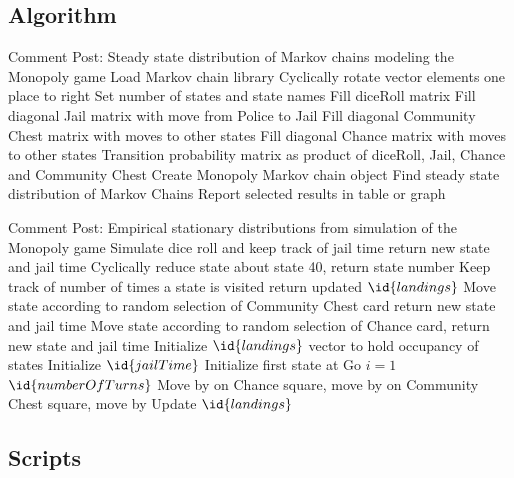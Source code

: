\documentclass[12pt]{article}
\begin{document}
\subsection*{Algorithm}
\begin{codebox}
  \zi Comment Post:  Steady state distribution
  \zi of Markov chains modeling the Monopoly game
  \li Load Markov chain library
  \li {}
  \li Cyclically rotate vector elements one place to right
  \zi
  \li Set number of states and state names
  \zi
  \li Fill diceRoll matrix
  \zi
  \li Fill diagonal Jail matrix with move from Police to Jail
  \zi
  \li Fill diagonal Community Chest matrix with moves to other states
  \zi
  \li Fill diagonal Chance matrix with moves to other states
  \zi
  \li Transition probability matrix as product of
  \zi diceRoll, Jail, Chance and Community Chest
  \li Create Monopoly Markov chain object
  \li Find steady state distribution of Markov Chains
  \li Report selected results in table or graph 
\end{codebox}

\begin{codebox}
  \zi Comment Post: Empirical stationary distributions
  \zi from simulation of the Monopoly game
  \li {}
  \li Simulate dice roll and
  \li keep track of jail time
  \li return new state and jail time
  \zi
  \li {}
  \li Cyclically reduce state about state 40,
  \li return state number
  \zi
  \li {}
  \li Keep track of number of times a state is visited
  \li return updated $\id{landings}$
  \zi
  \li {}
  \li Move state according to random selection
  \li of Community Chest card
  \li return new state and jail time
  \zi
  \li {}
  \li Move state according to random selection
  \li of Chance card,
  \li return new state and jail time
  \zi
  \li {}
  \li Initialize $\id{landings}$ vector to hold occupancy of states
  \li Initialize $\id{jailTime}$
  \li Initialize first state at Go
  \li \For $i = 1$ \To $\id{numberOfTurns}$
  \li         Move by 
  \li         \If on Chance square, move by 
  \li         \If on Community Chest square, move by 
  \li            Update  $\id{landings}$
\end{codebox}
\subsection*{Scripts}
\end{document}
